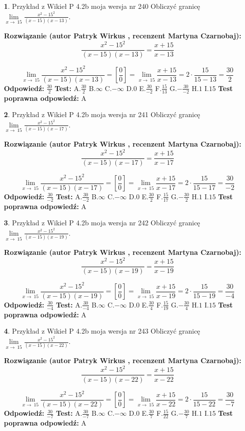 \documentclass[12pt, a4paper]{article}
\theoremstyle{definition} %
\newtheorem{zad}{}
\newcommand{\zadStart}[1]{\begin{zad}#1\newline}
\newcommand{\zadStop}{\end{zad}}
\newcommand{\rozwStart}[2]{\noindent \textbf{Rozwiązanie (autor #1 , recenzent #2): }\newline}
\newcommand{\rozwStop}{\newline}
\newcommand{\odpStart}{\noindent \textbf{Odpowiedź:}\newline}
\newcommand{\odpStop}{\newline}
\newcommand{\testStart}{\noindent \textbf{Test:}\newline}
\newcommand{\testStop}{\newline}
\newcommand{\kluczStart}{\noindent \textbf{Test poprawna odpowiedź:}\newline}
\newcommand{\kluczStop}{\newline}
\begin{document}
\zadStart{Przykład z Wikieł P 4.2b moja wersja nr 240}
Obliczyć granicę $\lim\limits_{x\to\ 15}\frac{x^{2}-15^{2}}{(x-15)(x-13)}$.
\zadStop
\rozwStart{Patryk Wirkus}{Martyna Czarnobaj}
$$\frac{x^{2}-15^{2}}{(x-15)(x-13)}=\frac{x+15}{x-13}$$

$$\lim\limits_{x\to\ 15}\frac{x^{2}-15^{2}}{(x-15)(x-13)}=[\frac{0}{0}]=\lim\limits_{x\to\ 15}\frac{x+15}{x-13}=2 \cdot \frac{15}{15-13} = \frac{30}{2}$$
\rozwStop
\odpStart
$\frac{30}{2}$
\odpStop
\testStart
A.$\frac{30}{2}$
B.$\infty$
C.$-\infty$
D.$0$
E.$\frac{30}{-2}$
F.$\frac{15}{13}$
G.$-\frac{30}{-2}$
H.$1$
I.$15$
\testStop
\kluczStart
A
\kluczStop



\zadStart{Przykład z Wikieł P 4.2b moja wersja nr 241}
Obliczyć granicę $\lim\limits_{x\to\ 15}\frac{x^{2}-15^{2}}{(x-15)(x-17)}$.
\zadStop
\rozwStart{Patryk Wirkus}{Martyna Czarnobaj}
$$\frac{x^{2}-15^{2}}{(x-15)(x-17)}=\frac{x+15}{x-17}$$

$$\lim\limits_{x\to\ 15}\frac{x^{2}-15^{2}}{(x-15)(x-17)}=[\frac{0}{0}]=\lim\limits_{x\to\ 15}\frac{x+15}{x-17}=2 \cdot \frac{15}{15-17} = \frac{30}{-2}$$
\rozwStop
\odpStart
$\frac{30}{-2}$
\odpStop
\testStart
A.$\frac{30}{-2}$
B.$\infty$
C.$-\infty$
D.$0$
E.$\frac{30}{2}$
F.$\frac{15}{17}$
G.$-\frac{30}{2}$
H.$1$
I.$15$
\testStop
\kluczStart
A
\kluczStop



\zadStart{Przykład z Wikieł P 4.2b moja wersja nr 242}
Obliczyć granicę $\lim\limits_{x\to\ 15}\frac{x^{2}-15^{2}}{(x-15)(x-19)}$.
\zadStop
\rozwStart{Patryk Wirkus}{Martyna Czarnobaj}
$$\frac{x^{2}-15^{2}}{(x-15)(x-19)}=\frac{x+15}{x-19}$$

$$\lim\limits_{x\to\ 15}\frac{x^{2}-15^{2}}{(x-15)(x-19)}=[\frac{0}{0}]=\lim\limits_{x\to\ 15}\frac{x+15}{x-19}=2 \cdot \frac{15}{15-19} = \frac{30}{-4}$$
\rozwStop
\odpStart
$\frac{30}{-4}$
\odpStop
\testStart
A.$\frac{30}{-4}$
B.$\infty$
C.$-\infty$
D.$0$
E.$\frac{30}{4}$
F.$\frac{15}{19}$
G.$-\frac{30}{4}$
H.$1$
I.$15$
\testStop
\kluczStart
A
\kluczStop



\zadStart{Przykład z Wikieł P 4.2b moja wersja nr 243}
Obliczyć granicę $\lim\limits_{x\to\ 15}\frac{x^{2}-15^{2}}{(x-15)(x-22)}$.
\zadStop
\rozwStart{Patryk Wirkus}{Martyna Czarnobaj}
$$\frac{x^{2}-15^{2}}{(x-15)(x-22)}=\frac{x+15}{x-22}$$

$$\lim\limits_{x\to\ 15}\frac{x^{2}-15^{2}}{(x-15)(x-22)}=[\frac{0}{0}]=\lim\limits_{x\to\ 15}\frac{x+15}{x-22}=2 \cdot \frac{15}{15-22} = \frac{30}{-7}$$
\rozwStop
\odpStart
$\frac{30}{-7}$
\odpStop
\testStart
A.$\frac{30}{-7}$
B.$\infty$
C.$-\infty$
D.$0$
E.$\frac{30}{7}$
F.$\frac{15}{22}$
G.$-\frac{30}{7}$
H.$1$
I.$15$
\testStop
\kluczStart
A
\kluczStop
\end{document}
